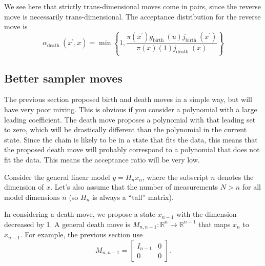 \documentclass[11pt]{article}
\begin{document}
We see here that strictly trans-dimensional moves come in pairs, since the reverse move is necessarily trans-dimensional. The acceptance distribution for the reverse move is
\begin{equation}
\alpha_{\text {death }}\left(x^{\prime}, x\right)=\min \left\{1, \frac{\pi\left(x^{\prime}\right) g_{\text {birth }}(u) j_{\text {birth }}\left(x^{\prime}\right)}{\pi(x)(1) j_{\text {death }}(x)}\right\}
\end{equation}


\subsection{Better sampler moves}
The previous section proposed birth and death moves in a simple way, but will have very poor mixing. 
This is obvious if you consider a polynomial with a large leading coefficient. 
The death move proposes a polynomial with that leading set to zero, which will be drastically different than the polynomial in the current state. 
Since the chain is likely to be in a state that fits the data, this means that the proposed death move will probably correspond to a polynomial that does not fit the data.
This means the acceptance ratio will be very low. 

Consider the general linear model $ y = H_n x_n $, where the subscript $n$ denotes the dimension of $x$.
Let's also assume that the number of measurements $N > n$ for all model dimensions $n$ (so $H_n$ is always a ``tall'' matrix). 

In considering a death move, we propose a state $x_{n-1}$ with the dimension decreased by 1.
A general death move is $M_{n, n-1} : \mathbb{R}^n \to \mathbb{R}^{n-1}$ that maps $x_n$ to $x_{n-1}$.
For example, the previous section use \begin{equation}
M_{n, n-1} =	 \begin{bmatrix} I_{n-1} & 0 \\ 0 & 0 \end{bmatrix} .
\end{equation}
\end{document}
